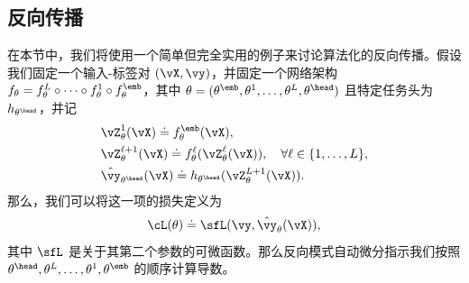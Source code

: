 \documentclass[../../book-main_zh.tex]{subfiles}
\begin{document}
\subsection{反向传播}
\label{app:BP-section}
在本节中，我们将使用一个简单但完全实用的例子来讨论算法化的反向传播。假设我们固定一个输入-标签对 \((\vX, \vy)\)，并固定一个网络架构 \(f_{\theta} = f_{\theta}^{L} \circ \cdots \circ f_{\theta}^{1} \circ
f_{\theta}^{\emb}\)，其中 \(\theta = (\theta^{\emb}, \theta^{1},
\dots, \theta^{L}, \theta^{\head})\) 且特定任务头为 \(h_{\theta^{\head}}\)，并记
\begin{align}
    &\vZ_{\theta}^{1}(\vX) \doteq f_{\theta}^{\emb}(\vX), \\
    &\vZ_{\theta}^{\ell + 1}(\vX) \doteq
    f_{\theta}^{\ell}(\vZ_{\theta}^{\ell}(\vX)), \quad \forall \ell
    \in \{1, \dots, L\}, \\
    &\hat{\vy}_{\theta^{\head}}(\vX) \doteq h_{\theta^{\head}}(\vZ_{\theta}^{L+1}(\vX)).
\end{align}
那么，我们可以将这一项的损失定义为
\begin{equation}
    \cL(\theta) \doteq \sfL(\vy, \hat{\vy}_{\theta}(\vX)),
\end{equation}
其中 \(\sfL\) 是关于其第二个参数的可微函数。那么反向模式自动微分指示我们按照 \(\theta^{\head}, \theta^{L}, \dots, \theta^{1}, \theta^{\emb}\) 的顺序计算导数。
\end{document}
